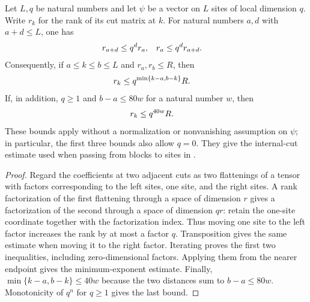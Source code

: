 \begin{lemma}
    \label{thm:chain_cut_rank_growth}
    \leanok
    Let $L,q$ be natural numbers and let $\psi$ be a vector on $L$ sites
    of local dimension $q$. Write $r_k$ for the rank of its cut matrix at
    $k$. For natural numbers $a,d$ with $a+d\leq L$, one has
    \begin{align}
        r_{a+d} & \leq q^d r_a,
                & r_a           & \leq q^d r_{a+d}. \notag
    \end{align}
    Consequently, if $a\leq k\leq b\leq L$ and $r_a,r_b\leq R$, then
    \begin{align}
        r_k & \leq q^{\min\{k-a,b-k\}}R. \notag
    \end{align}
    If, in addition, $q\geq1$ and $b-a\leq80w$ for a natural number $w$,
    then
    \begin{align}
        r_k & \leq q^{40w}R. \notag
    \end{align}
    These bounds apply without a normalization or nonvanishing assumption
    on $\psi$; in particular, the first three bounds also allow $q=0$.
    They give the internal-cut estimate used when passing from blocks to
    sites in \cite[Part~II, proof of Theorem~B]{TNLean2026OneDimensional}.
\end{lemma}
\begin{proof}\leanok
    Regard the coefficients at two adjacent cuts as two flattenings of a
    tensor with factors corresponding to the left sites, one site, and
    the right sites. A rank factorization of the first flattening through
    a space of dimension $r$ gives a factorization of the second through
    a space of dimension $qr$: retain the one-site coordinate together
    with the factorization index. Thus moving one site to the left
    factor increases the rank by at most a factor $q$. Transposition gives
    the same estimate when moving it to the right factor. Iterating proves
    the first two inequalities, including zero-dimensional factors.
    Applying them from the nearer endpoint gives the minimum-exponent
    estimate. Finally,
    $\min\{k-a,b-k\}\leq40w$ because the two distances sum to $b-a\leq80w$.
    Monotonicity of $q^n$ for $q\geq1$ gives the last bound.
\end{proof}

